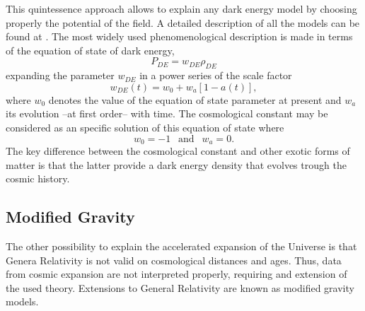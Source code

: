 This quintessence approach allows to explain any dark energy model by choosing properly the potential of the field. A detailed description of all the models can be found at \cite{2010deto.book.....A}. The most widely used phenomenological description is made in terms of the equation of state of dark energy,
\begin{equation}
P_{DE} = w_{DE}\rho_{DE}
\end{equation}
expanding the parameter $w_{DE}$ in a power series of the scale factor
\begin{equation}
w_{DE}(t) = w_0 +w_a[1-a(t)],
\end{equation}
where $w_0$ denotes the value of the equation of state parameter at present and $w_a$ its evolution --at first order-- with time. The cosmological constant may be considered as an specific solution of this equation of state where
\begin{equation}
w_0=-1\ \ \mbox{ and }\ \ w_a=0.
\end{equation}
The key difference between the cosmological constant and other exotic forms of matter is that the latter provide a dark energy density that evolves trough the cosmic history.

\subsection{Modified Gravity}
The other possibility to explain the accelerated expansion of the Universe is that Genera Relativity is not valid on cosmological distances and ages. Thus, data from cosmic expansion are not interpreted properly, requiring and extension of the used theory.  Extensions to General Relativity are known as modified gravity models.
\newline

